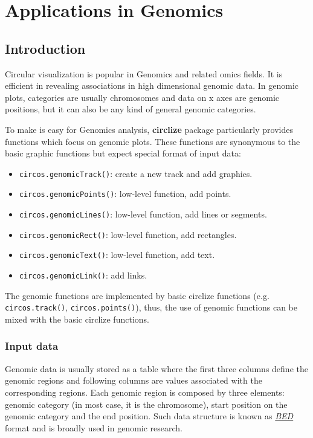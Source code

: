 \documentclass[]{book}
\providecommand{\tightlist}{%
  \setlength{\itemsep}{0pt}\setlength{\parskip}{0pt}}
\theoremstyle{definition}
\theoremstyle{definition}
\theoremstyle{remark}
\begin{document}
\part{Applications in
Genomics}\label{part-applications-in-genomics}

\chapter{Introduction}\label{genomic-introduction}

Circular visualization is popular in Genomics and related omics fields.
It is efficient in revealing associations in high dimensional genomic
data. In genomic plots, categories are usually chromosomes and data on x
axes are genomic positions, but it can also be any kind of general
genomic categories.

To make is easy for Genomics analysis, \textbf{circlize} package
particularly provides functions which focus on genomic plots. These
functions are synonymous to the basic graphic functions but expect
special format of input data:

\begin{itemize}
\tightlist
\item
  \texttt{circos.genomicTrack()}: create a new track and add graphics.
\item
  \texttt{circos.genomicPoints()}: low-level function, add points.
\item
  \texttt{circos.genomicLines()}: low-level function, add lines or
  segments.
\item
  \texttt{circos.genomicRect()}: low-level function, add rectangles.
\item
  \texttt{circos.genomicText()}: low-level function, add text.
\item
  \texttt{circos.genomicLink()}: add links.
\end{itemize}

The genomic functions are implemented by basic circlize functions (e.g.
\texttt{circos.track()}, \texttt{circos.points()}), thus, the use of
genomic functions can be mixed with the basic circlize functions.

\section{Input data}\label{input-data}

Genomic data is usually stored as a table where the first three columns
define the genomic regions and following columns are values associated
with the corresponding regions. Each genomic region is composed by three
elements: genomic category (in most case, it is the chromosome), start
position on the genomic category and the end position. Such data
structure is known as
\href{https://genome.ucsc.edu/FAQ/FAQformat\#format1}{\emph{BED}} format
and is broadly used in genomic research.
\end{document}
